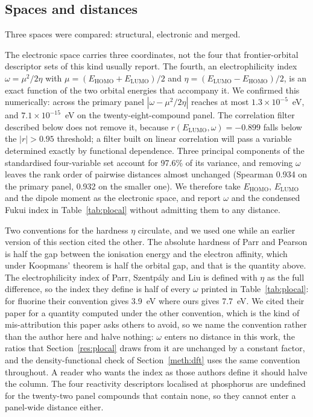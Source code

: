\documentclass[11pt,a4paper]{article}
\begin{document}
\subsection{Spaces and distances}
\label{meth:spaces}
Three spaces were compared: structural, electronic and merged.

The electronic space carries three coordinates, not the four that frontier-orbital
descriptor sets of this kind usually report. The fourth, an electrophilicity
index $\omega = \mu^{2}/2\eta$ with $\mu = (E_{\mathrm{HOMO}} +
E_{\mathrm{LUMO}})/2$ and $\eta = (E_{\mathrm{LUMO}} - E_{\mathrm{HOMO}})/2$,
is an exact function of the two orbital energies that accompany
it. We confirmed this numerically: across the primary panel
$|\omega - \mu^{2}/2\eta|$ reaches at most
$1.3\times10^{-5}$~eV, and $7.1\times10^{-15}$~eV on the
twenty-eight-compound panel. The correlation filter
described below does not remove it, because $r(E_{\mathrm{LUMO}}, \omega) =
-0.899$ falls below the $|r|>0.95$ threshold; a filter built on linear
correlation will pass a variable determined exactly by functional
dependence. Three principal components of
the standardised four-variable set account for 97.6\% of its variance, and
removing $\omega$ leaves the rank order of pairwise distances almost unchanged
(Spearman 0.934 on the primary panel, 0.932 on the smaller one). We therefore take $E_{\mathrm{HOMO}}$, $E_{\mathrm{LUMO}}$ and
the dipole moment as the electronic space, and report $\omega$ and the condensed
Fukui index in Table~\ref{tab:plocal} without admitting them to
any distance.

Two conventions for the hardness $\eta$ circulate, and we used one while an
earlier version of this section cited the other. The absolute hardness of Parr
and Pearson is half the gap between the ionisation energy and the electron
affinity, which under Koopmans' theorem is half the orbital gap, and that is the
quantity above. The electrophilicity index of Parr, Szentp\'aly and Liu
\cite{parr1999} is defined with $\eta$ as the full difference, so the index they
define is half of every $\omega$ printed in Table~\ref{tab:plocal}: for fluorine
their convention gives 3.9~eV where ours gives 7.7~eV. We cited their paper for
a quantity computed under the other convention, which is the kind of
mis-attribution this paper asks others to avoid, so we name the convention
rather than the author here and halve nothing: $\omega$ enters no distance in
this work, the ratios that Section~\ref{res:plocal} draws from it are unchanged
by a constant factor, and the density-functional check of
Section~\ref{meth:dft} uses the same convention throughout. A reader who wants
the index as those authors define it should halve the column. The four reactivity descriptors localised at phosphorus
are undefined for the twenty-two panel compounds that contain none, so they
cannot enter a panel-wide distance either.
\end{document}
